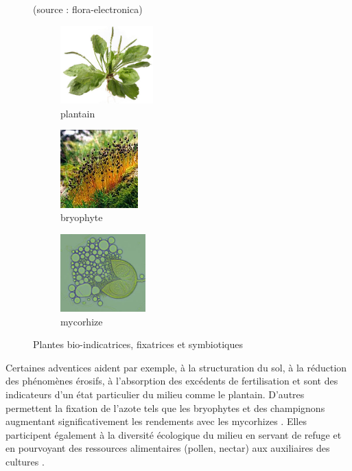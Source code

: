 \documentclass[../thesis.tex]{subfiles}
\begin{document}
    \begin{figure}[H]
        \centering
        {\scriptsize (source : flora-electronica)} \\
        \begin{subfigure}{0.2\linewidth}
            \includegraphics[height=3cm]{img/intro/plante-plantain.jpg}
            \caption{plantain}
        \end{subfigure}
        \hspace{1cm}
        \begin{subfigure}{0.2\linewidth}
            \includegraphics[height=3cm]{img/intro/plante-bryophyte.jpg}
            \caption{bryophyte}
        \end{subfigure}
        \hspace{1cm}
        \begin{subfigure}{0.2\linewidth}
            \includegraphics[height=3cm]{img/intro/plante-mycorrhiza}
            \caption{mycorhize}
        \end{subfigure}
        \caption{Plantes bio-indicatrices, fixatrices et symbiotiques}
        \label{fig:02-adventice-service}
    \end{figure}
    
    Certaines adventices aident par exemple, à la structuration du sol, à la réduction des phénomènes érosifs, à l'absorption des excédents de fertilisation et sont des indicateurs d'un état particulier du milieu comme le plantain. D'autres permettent la fixation de l'azote tels que les bryophytes et des champignons augmentant significativement les rendements avec les mycorhizes \cite{zerbib2018relations}. Elles participent également à la diversité écologique du milieu en servant de refuge et en pourvoyant des ressources alimentaires (pollen, nectar) aux auxiliaires des cultures \cite{schaub2010mieux, morison2008comment}.
    
\end{document}
